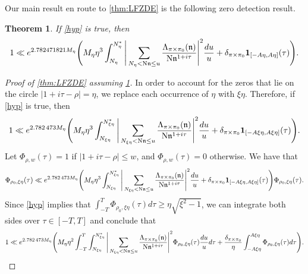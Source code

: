 \documentclass[11pt]{amsart}
\newtheorem{theorem}{Theorem}[section]
\theoremstyle{remark}
\numberwithin{equation}{section}
\newcommand{\kn}{\mathfrak{n}}
\newcommand{\N}{\textnormal{N}}
\begin{document}
Our main result en route to \cref{thm:LFZDE} is the following zero detection result.

\begin{theorem}
\label{thm:detect}
If \cref{hyp} is true, then
\[
1\ll e^{2.782471821 M_{\eta}}\Bigg(M_{\eta}\eta^3\int_{N_{\eta}}^{N_{\eta}^*}\Bigg|\sum_{N_{\eta}<\N\kn\leq u}\frac{\Lambda_{\pi\times\pi_0}(\kn)}{\N\kn^{1+i\tau}}\Bigg|^2\frac{du}{u}+\delta_{\pi\times\pi_0}\mathbf{1}_{[-A\eta,A\eta]}(\tau)\Bigg).
\]
\end{theorem}

\begin{proof}[Proof of \cref{thm:LFZDE} assuming \cref{thm:detect}]

In order to account for the zeros that lie on the circle $|1+i\tau-\rho|=\eta$, we replace each occurrence of $\eta$ with $\xi\eta$.  Therefore, if \cref{hyp} is true, then
\[
1\ll e^{2.782\,473 M_{\eta}}\Bigg(M_{\eta}\eta^3\int_{N_{\xi\eta}}^{N_{\xi\eta}^*}\Bigg|\sum_{N_{\xi\eta}<\N\kn\leq u}\frac{\Lambda_{\pi\times\pi_0}(\kn)}{\N\kn^{1+i\tau}}\Bigg|^2\frac{du}{u}+\delta_{\pi\times\pi_0}\mathbf{1}_{[-A\xi\eta,A\xi\eta]}(\tau)\Bigg).
\]
Let $\Phi_{\rho,w}(\tau)=1$ if $|1+i\tau-\rho|\leq w$, and $\Phi_{\rho,w}(\tau)=0$ otherwise.  We have that
\[
\Phi_{\rho_0,\xi\eta}(\tau)\ll e^{2.782\,473 M_{\eta}}\Bigg(M_{\eta}\eta^3\int_{N_{\xi\eta}}^{N_{\xi\eta}^*}\Bigg|\sum_{N_{\xi\eta}<\N\kn\leq u}\frac{\Lambda_{\pi\times\pi_0}(\kn)}{\N\kn^{1+i\tau}}\Bigg|^2\frac{du}{u}+\delta_{\pi\times\pi_0}\mathbf{1}_{[-A\xi\eta,A\xi\eta]}(\tau)\Bigg)\Phi_{\rho_0,\xi\eta}(\tau).
\]
Since \cref{hyp} implies that $\int_{-T}^T \Phi_{\rho_0,\xi\eta}(\tau)d\tau\geq \eta\sqrt{\xi^2-1}$, we can integrate both sides over $\tau\in[-T,T]$ and conclude that
\[
1\ll  e^{2.782\,473 M_{\eta}}\Bigg(M_{\eta}\eta^2\int_{-T}^{T}\int_{N_{\xi\eta}}^{N_{\xi\eta}^*}\Bigg|\sum_{N_{\xi\eta}<\N\kn\leq u}\frac{\Lambda_{\pi\times\pi_0}(\kn)}{\N\kn^{1+i\tau}}\Bigg|^2 \Phi_{\rho_0,\xi\eta}(\tau)\frac{du}{u}d\tau+\frac{\delta_{\pi\times\pi_0}}{\eta}\int_{-A\xi\eta}^{A\xi\eta}\Phi_{\rho_0,\xi\eta}(\tau)d\tau\Bigg).
\]


\end{proof}
\end{document}

